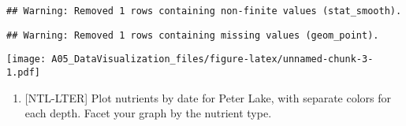 \documentclass[]{article}
\providecommand{\tightlist}{%
  \setlength{\itemsep}{0pt}\setlength{\parskip}{0pt}}
\begin{document}
\begin{verbatim}
## Warning: Removed 1 rows containing non-finite values (stat_smooth).
\end{verbatim}

\begin{verbatim}
## Warning: Removed 1 rows containing missing values (geom_point).
\end{verbatim}

\texttt{[image: A05\_DataVisualization\_files/figure-latex/unnamed-chunk-3-1.pdf]}

\begin{enumerate}
\def\labelenumi{\arabic{enumi}.}
\setcounter{enumi}{4}
\tightlist
\item
  {[}NTL-LTER{]} Plot nutrients by date for Peter Lake, with separate
  colors for each depth. Facet your graph by the nutrient type.
\end{enumerate}
\end{document}

